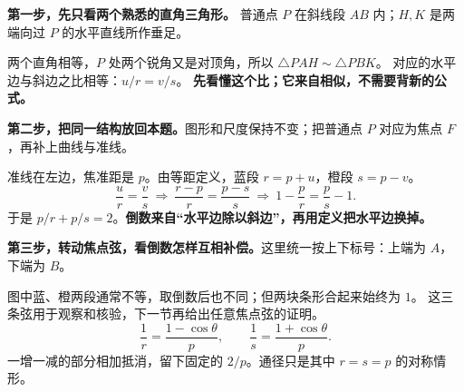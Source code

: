 \clearpage
\begin{explanationbox}
\textbf{第一步，先只看两个熟悉的直角三角形。}
普通点 $P$ 在斜线段 $AB$ 内；$H,K$ 是两端向过 $P$ 的水平直线所作垂足。
\begin{center}\end{center}
两个直角相等，$P$ 处两个锐角又是对顶角，所以 $\triangle PAH\sim\triangle PBK$。
对应的水平边与斜边之比相等：$u/r=v/s$。
\textbf{先看懂这个比；它来自相似，不需要背新的公式。}
\end{explanationbox}
\clearpage
\begin{explanationbox}
\textbf{第二步，把同一结构放回本题。}图形和尺度保持不变；把普通点 $P$ 对应为焦点 $F$，再补上曲线与准线。
\begin{center}\end{center}
准线在左边，焦准距是 $p$。由等距定义，蓝段 $r=p+u$，橙段 $s=p-v$。
\[
 \frac ur=\frac vs
 \ \Longrightarrow\ \frac{r-p}{r}=\frac{p-s}{s}
 \ \Longrightarrow\ 1-\frac pr=\frac ps-1.
\]
于是 $p/r+p/s=2$。\textbf{倒数来自“水平边除以斜边”，再用定义把水平边换掉。}
\end{explanationbox}
\clearpage
\begin{explanationbox}
\textbf{第三步，转动焦点弦，看倒数怎样互相补偿。}这里统一按上下标号：上端为 $A$，下端为 $B$。
\begin{center}\end{center}
图中蓝、橙两段通常不等，取倒数后也不同；但两块条形合起来始终为 $1$。
这三条弦用于观察和核验，下一节再给出任意焦点弦的证明。
\[
 \frac1r=\frac{1-\cos\theta}{p},\qquad
 \frac1s=\frac{1+\cos\theta}{p}.
\]
一增一减的部分相加抵消，留下固定的 $2/p$。通径只是其中 $r=s=p$ 的对称情形。
\end{explanationbox}

